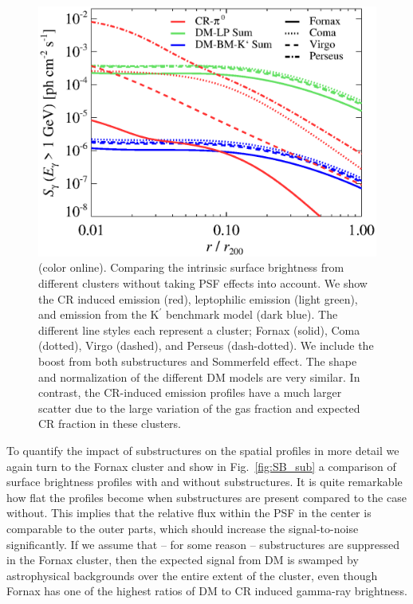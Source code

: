\documentclass[10pt,aps,pra,reprint,amsmath,amsfonts,amssymb,showpacs,nofootinbib,floatfix]{revtex4-1}
\newcommand{\rmn}{\mathrm}
\newcommand{\Kp}{\rmn{K}^\prime}
\newcommand{\colo}{(color online). }
\begin{document}
\begin{figure}
 \includegraphics[width=0.99\columnwidth]{figures/SB.v14.1GeV.SF700.SubMass.elmu.bw.eps}
 \caption{\colo Comparing the intrinsic surface
   brightness from different clusters without taking PSF effects into
   account. We show the CR induced emission (red), leptophilic
   emission (light green), and emission from the $\Kp$ benchmark model
   (dark blue). The different line styles each represent a cluster;
   Fornax (solid), Coma (dotted), Virgo (dashed), and Perseus
   (dash-dotted). We include the boost from both substructures and
   Sommerfeld effect. The shape and normalization of the different DM
   models are very similar. In contrast, the CR-induced emission
   profiles have a much larger scatter due to the large variation of
   the gas fraction and expected CR fraction in these clusters.}
 \label{fig:SB_clu}
\end{figure}

To quantify the impact of substructures on the spatial profiles in
more detail we again turn to the Fornax cluster and show in
Fig.~\ref{fig:SB_sub} a comparison of surface brightness profiles with
and without substructures. It is quite remarkable how flat the
profiles become when substructures are present compared to the case
without. This implies that the relative flux within the PSF in the
center is comparable to the outer parts, which should increase the
signal-to-noise significantly. If we assume that -- for
some reason -- substructures are suppressed in the Fornax cluster, then the expected
signal from DM is swamped by astrophysical backgrounds over the entire
extent of the cluster, even though Fornax has one of the highest
ratios of DM to CR induced gamma-ray brightness.
\end{document}
